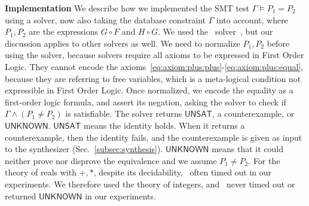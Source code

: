 {\bf Implementation} We describe how we implemented the SMT test
$\Gamma \models P_1 = P_2$ using a solver, now also taking
the database constraint $\Gamma$ into account, where
$P_1, P_2$ are the expressions $G\circ F$
and $H \circ G$. We used the \zzz\ solver~\cite{10.1007/978-3-540-78800-3_24}, but our
discussion applies to other solvers as well. We need to normalize
$P_1, P_2$ before using the solver, because solvers require all axioms
to be expressed in First Order Logic. They cannot encode the
axioms~\eqref{eq:axiom:plus:plus}-\eqref{eq:axiom:plus:equal}, because
they are referring to free variables, which is a
meta-logical condition not expressible in First Order Logic.
Once normalized, we encode the equality as a first-order logic
formula, and assert its negation, asking the solver to check if
$\Gamma \wedge \left(P_1 \neq P_2\right)$ is satisfiable.  The solver
returns $\textsf{UNSAT}$, a counterexample, or
$\textsf{UNKNOWN}$.  $\textsf{UNSAT}$ means the
identity holds.  When it returns a counterexample, then the identity
fails, and the counterexample is given as input to the synthesizer
(Sec.~\ref{subsec:synthesis}).  $\textsf{UNKNOWN}$ means that it could
neither prove nor disprove the equivalence and we
assume $P_1 \neq P_2$.  For the theory of reals with $+, *$, despite its
decidability,  \zzz\ often timed out in our experiments.
We therefore used the theory of integers, and
\zzz\ never timed out or returned $\textsf{UNKNOWN}$ in our experiments.



